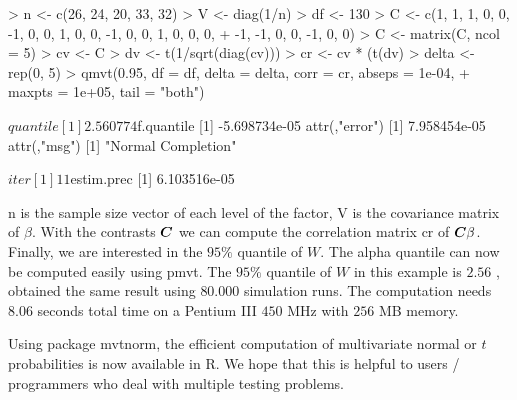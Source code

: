 \documentclass[11pt]{amsart}
\newcommand{\C}{\mbox{\boldmath $C$}}
\begin{document}
\begin{Schunk}
\begin{Sinput}
> n <- c(26, 24, 20, 33, 32)
> V <- diag(1/n)
> df <- 130
> C <- c(1, 1, 1, 0, 0, -1, 0, 0, 1, 0, 0, -1, 0, 0, 1, 0, 0, 0, 
+     -1, -1, 0, 0, -1, 0, 0)
> C <- matrix(C, ncol = 5)
> cv <- C %*% V %*% t(C)
> dv <- t(1/sqrt(diag(cv)))
> cr <- cv * (t(dv) %*% dv)
> delta <- rep(0, 5)
> qmvt(0.95, df = df, delta = delta, corr = cr, abseps = 1e-04, 
+     maxpts = 1e+05, tail = "both")
\end{Sinput}
\begin{Soutput}
$quantile
[1] 2.560774

$f.quantile
[1] -5.698734e-05
attr(,"error")
[1] 7.958454e-05
attr(,"msg")
[1] "Normal Completion"

$iter
[1] 11

$estim.prec
[1] 6.103516e-05
\end{Soutput}
\end{Schunk}
{\ttfamily n} is the sample size vector of each level of the
factor, {\ttfamily V} is the covariance matrix of $ \beta $. With
the contrasts $ \C $ we can compute the correlation matrix
{\ttfamily cr} of $ \C\beta $. Finally, we are interested in the
$ 95\%$ quantile of $ W $. The {\ttfamily
alpha} quantile can now be computed easily using {\ttfamily
pmvt}. The $95\%$ quantile of $ W $ in this example is $ 2.56 $
, \cite{the-effici:1987} obtained the same result using $ 80.000
$ simulation runs. The computation needs $ 8.06 $ seconds total
time on a Pentium III $450$ MHz with $256$ MB memory.

Using package {\ttfamily mvtnorm}, the efficient computation of
multivariate normal or $ t $ probabilities is now available
in {\ttfamily R}. We hope that this is helpful to users / programmers who
deal with multiple testing problems.



\end{document}
